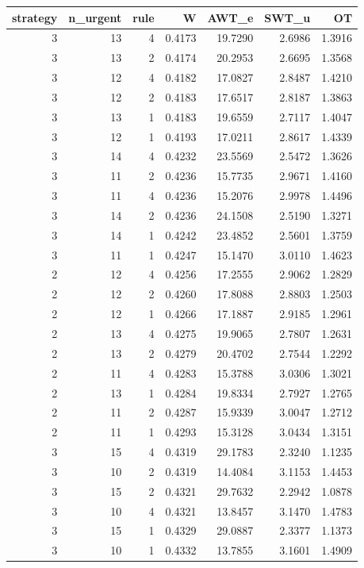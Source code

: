 \begin{tabular}{rrrrrrr}
\toprule
strategy & n_urgent & rule & W & AWT_e & SWT_u & OT \\
\midrule
3 & 13 & 4 & 0.4173 & 19.7290 & 2.6986 & 1.3916 \\
3 & 13 & 2 & 0.4174 & 20.2953 & 2.6695 & 1.3568 \\
3 & 12 & 4 & 0.4182 & 17.0827 & 2.8487 & 1.4210 \\
3 & 12 & 2 & 0.4183 & 17.6517 & 2.8187 & 1.3863 \\
3 & 13 & 1 & 0.4183 & 19.6559 & 2.7117 & 1.4047 \\
3 & 12 & 1 & 0.4193 & 17.0211 & 2.8617 & 1.4339 \\
3 & 14 & 4 & 0.4232 & 23.5569 & 2.5472 & 1.3626 \\
3 & 11 & 2 & 0.4236 & 15.7735 & 2.9671 & 1.4160 \\
3 & 11 & 4 & 0.4236 & 15.2076 & 2.9978 & 1.4496 \\
3 & 14 & 2 & 0.4236 & 24.1508 & 2.5190 & 1.3271 \\
3 & 14 & 1 & 0.4242 & 23.4852 & 2.5601 & 1.3759 \\
3 & 11 & 1 & 0.4247 & 15.1470 & 3.0110 & 1.4623 \\
2 & 12 & 4 & 0.4256 & 17.2555 & 2.9062 & 1.2829 \\
2 & 12 & 2 & 0.4260 & 17.8088 & 2.8803 & 1.2503 \\
2 & 12 & 1 & 0.4266 & 17.1887 & 2.9185 & 1.2961 \\
2 & 13 & 4 & 0.4275 & 19.9065 & 2.7807 & 1.2631 \\
2 & 13 & 2 & 0.4279 & 20.4702 & 2.7544 & 1.2292 \\
2 & 11 & 4 & 0.4283 & 15.3788 & 3.0306 & 1.3021 \\
2 & 13 & 1 & 0.4284 & 19.8334 & 2.7927 & 1.2765 \\
2 & 11 & 2 & 0.4287 & 15.9339 & 3.0047 & 1.2712 \\
2 & 11 & 1 & 0.4293 & 15.3128 & 3.0434 & 1.3151 \\
3 & 15 & 4 & 0.4319 & 29.1783 & 2.3240 & 1.1235 \\
3 & 10 & 2 & 0.4319 & 14.4084 & 3.1153 & 1.4453 \\
3 & 15 & 2 & 0.4321 & 29.7632 & 2.2942 & 1.0878 \\
3 & 10 & 4 & 0.4321 & 13.8457 & 3.1470 & 1.4783 \\
3 & 15 & 1 & 0.4329 & 29.0887 & 2.3377 & 1.1373 \\
3 & 10 & 1 & 0.4332 & 13.7855 & 3.1601 & 1.4909 \\

\end{tabular}
